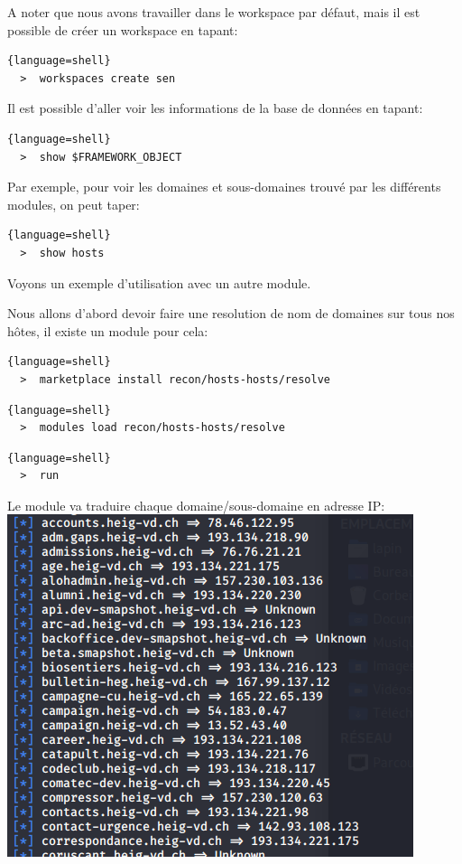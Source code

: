 A noter que nous avons travailler dans le workspace par défaut, mais il est possible de créer un workspace en tapant:

\begin{lstlisting}{language=shell}
  >  workspaces create sen
\end{lstlisting}

Il est possible d'aller voir les informations de la base de données en tapant:

\begin{lstlisting}{language=shell}
  >  show $FRAMEWORK_OBJECT
\end{lstlisting}

Par exemple, pour voir les domaines et sous-domaines trouvé par les différents modules, on peut taper:

\begin{lstlisting}{language=shell}
  >  show hosts
\end{lstlisting}

Voyons un exemple d'utilisation avec un autre module.

Nous allons d'abord devoir faire une resolution de nom de domaines sur tous nos hôtes, il existe un module pour cela:

\begin{lstlisting}{language=shell}
  >  marketplace install recon/hosts-hosts/resolve
\end{lstlisting}

\begin{lstlisting}{language=shell}
  >  modules load recon/hosts-hosts/resolve
\end{lstlisting}

\begin{lstlisting}{language=shell}
  >  run
\end{lstlisting}

Le module va traduire chaque domaine/sous-domaine en adresse IP: \\

\includegraphics[scale=0.48]{images/SEN_Projet_Image021.png} \\


